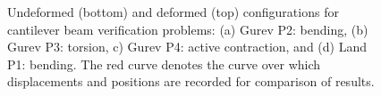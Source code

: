 \begin{figure}[ht]
{\label{fig:beams3}}		
%
\caption{Undeformed (bottom) and deformed (top) configurations for cantilever beam verification problems: (a) Gurev P2: bending, (b) Gurev P3: torsion, c) Gurev P4: active contraction, and (d) Land P1: bending. The red curve denotes the curve over which displacements and positions are recorded for comparison of results.}
\label{fig:beams}
\end{figure}

